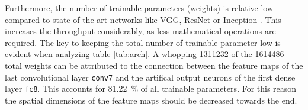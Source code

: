 Furthermore, the number of trainable parameters (weights) is relative low compared to state-of-the-art networks like VGG, ResNet or Inception \cite{training_arch_keras}.
This increases the throughput considerably, as less mathematical operations are required.
The key to keeping the total number of trainable parameter low is evident when analyzing table \ref{tab:arch}.
A whopping \num{1311232} of the \num{1614486} total weights can be attributed to the connection between the feature maps of the last convolutional layer \texttt{conv7} and the artifical output neurons of the first dense layer \texttt{fc8}.
This accounts for \SI{81.22}{\percent} of all trainable parameters.
For this reason the spatial dimensions of the feature maps should be decreased towards the end.

